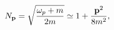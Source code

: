 \begin{equation}
N_{\mathbf{p}}=\sqrt{\frac{\omega _{p}+m}{2m}}\simeq 1+\frac{\mathbf{p}^{2}}{%
8m^{2}},
\end{equation}

